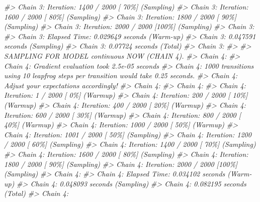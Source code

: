 \documentclass[10pt,a4paper,onecolumn]{article}
\newenvironment{Shaded}{\begin{snugshade}}{\end{snugshade}}
\newcommand{\CommentTok}[1]{\textcolor[rgb]{0.56,0.35,0.01}{\textit{#1}}}
\begin{document}
\begin{Shaded}
\begin{Highlighting}[]
\CommentTok{\#\textgreater{} Chain 3: Iteration: 1400 / 2000 [ 70\%]  (Sampling)}
\CommentTok{\#\textgreater{} Chain 3: Iteration: 1600 / 2000 [ 80\%]  (Sampling)}
\CommentTok{\#\textgreater{} Chain 3: Iteration: 1800 / 2000 [ 90\%]  (Sampling)}
\CommentTok{\#\textgreater{} Chain 3: Iteration: 2000 / 2000 [100\%]  (Sampling)}
\CommentTok{\#\textgreater{} Chain 3: }
\CommentTok{\#\textgreater{} Chain 3:  Elapsed Time: 0.029649 seconds (Warm{-}up)}
\CommentTok{\#\textgreater{} Chain 3:                0.047591 seconds (Sampling)}
\CommentTok{\#\textgreater{} Chain 3:                0.07724 seconds (Total)}
\CommentTok{\#\textgreater{} Chain 3: }
\CommentTok{\#\textgreater{} }
\CommentTok{\#\textgreater{} SAMPLING FOR MODEL \textquotesingle{}continuous\textquotesingle{} NOW (CHAIN 4).}
\CommentTok{\#\textgreater{} Chain 4: }
\CommentTok{\#\textgreater{} Chain 4: Gradient evaluation took 2.5e{-}05 seconds}
\CommentTok{\#\textgreater{} Chain 4: 1000 transitions using 10 leapfrog steps per transition would take 0.25 seconds.}
\CommentTok{\#\textgreater{} Chain 4: Adjust your expectations accordingly!}
\CommentTok{\#\textgreater{} Chain 4: }
\CommentTok{\#\textgreater{} Chain 4: }
\CommentTok{\#\textgreater{} Chain 4: Iteration:    1 / 2000 [  0\%]  (Warmup)}
\CommentTok{\#\textgreater{} Chain 4: Iteration:  200 / 2000 [ 10\%]  (Warmup)}
\CommentTok{\#\textgreater{} Chain 4: Iteration:  400 / 2000 [ 20\%]  (Warmup)}
\CommentTok{\#\textgreater{} Chain 4: Iteration:  600 / 2000 [ 30\%]  (Warmup)}
\CommentTok{\#\textgreater{} Chain 4: Iteration:  800 / 2000 [ 40\%]  (Warmup)}
\CommentTok{\#\textgreater{} Chain 4: Iteration: 1000 / 2000 [ 50\%]  (Warmup)}
\CommentTok{\#\textgreater{} Chain 4: Iteration: 1001 / 2000 [ 50\%]  (Sampling)}
\CommentTok{\#\textgreater{} Chain 4: Iteration: 1200 / 2000 [ 60\%]  (Sampling)}
\CommentTok{\#\textgreater{} Chain 4: Iteration: 1400 / 2000 [ 70\%]  (Sampling)}
\CommentTok{\#\textgreater{} Chain 4: Iteration: 1600 / 2000 [ 80\%]  (Sampling)}
\CommentTok{\#\textgreater{} Chain 4: Iteration: 1800 / 2000 [ 90\%]  (Sampling)}
\CommentTok{\#\textgreater{} Chain 4: Iteration: 2000 / 2000 [100\%]  (Sampling)}
\CommentTok{\#\textgreater{} Chain 4: }
\CommentTok{\#\textgreater{} Chain 4:  Elapsed Time: 0.034102 seconds (Warm{-}up)}
\CommentTok{\#\textgreater{} Chain 4:                0.048093 seconds (Sampling)}
\CommentTok{\#\textgreater{} Chain 4:                0.082195 seconds (Total)}
\CommentTok{\#\textgreater{} Chain 4:}
\end{Highlighting}
\end{Shaded}
\end{document}
